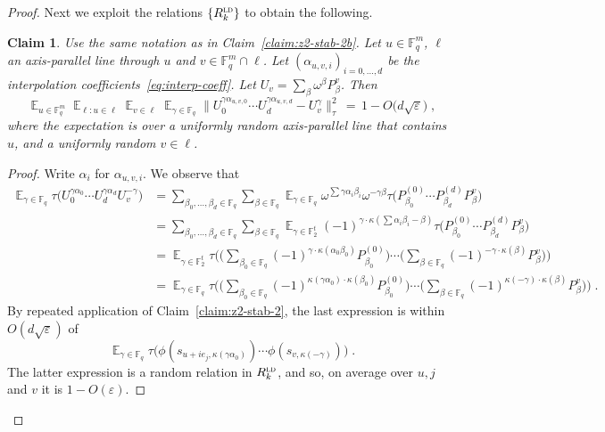 \documentclass[11pt]{article}
\newtheorem{claim}[theorem]{Claim}
\theoremstyle{definition}
\DeclareMathOperator*{\Expectation}{\mathbb{E}}
\newcommand{\Es}[1]{\Expectation_{#1}}
\newcommand{\F}{\ensuremath{\mathbb{F}}}
\newcommand{\ld}{\textsc{ld}}
\newcommand{\eps}{\varepsilon}
\begin{document}
\begin{proof}
Next we exploit the relations $\{R^\ld_k\}$ to obtain the following. 

\begin{claim}\label{claim:z2-stab-5}
Use the same notation as in Claim~\ref{claim:z2-stab-2b}. Let $u\in \F_q^m$, $\ell$ an axis-parallel line through $u$ and $v\in\F_q^m\cap \ell$. Let $(\alpha_{u,v,i})_{i=0,\ldots,d}$ be the interpolation coefficients~\eqref{eq:interp-coeff}. Let $U_v = \sum_\beta \omega^\beta P^v_\beta$. Then 
\begin{equation}\label{eq:z2-stab-5-0}
\Es{u\in\F_q^m} \Es{\ell: u\in \ell} \Es{v\in \ell} \Es{\gamma\in\F_q} \Big\| U_0^{\gamma \alpha_{u,v,0}}\cdots U_d^{\gamma  \alpha_{u,v,d}} - U_v^\gamma \big\|_\tau^2 \,=\, 1-O\big(d\sqrt{\eps}\big)\;,
\end{equation}
where the expectation is over a uniformly random axis-parallel line that contains $u$, and a uniformly random $v\in\ell$. 
\end{claim}

\begin{proof}
Write $\alpha_i$ for $\alpha_{u,v,i}$. 
We observe that 
\begin{align*}
\Es{\gamma\in\F_q} \tau\big( U_0^{\gamma\alpha_{0}}\cdots U_d^{\gamma\alpha_{d}} U_v^{-\gamma} \big)
&=  \sum_{\beta_0,\ldots,\beta_d\in\F_q}\sum_{\beta\in\F_q} \Es{\gamma\in\F_q} \omega^{\sum \gamma \alpha_i\beta_i} \omega^{-\gamma\beta} \tau\big( P^{(0)}_{\beta_0} \cdots P^{(d)}_{\beta_d} P^v_\beta \big)\\
&= \sum_{\beta_0,\ldots,\beta_d\in\F_q}\sum_{\beta\in\F_q}\Es{\gamma\in\F_2^t} (-1)^{\gamma\cdot \kappa(\sum \alpha_i\beta_i-\beta)} \tau\big( P^{(0)}_{\beta_0} \cdots P^{(d)}_{\beta_d} P^v_\beta \big)\\
&=\Es{\gamma\in\F_2^t}  \tau\Big( \Big(\sum_{\beta_0\in \F_q} (-1)^{\gamma\cdot \kappa(\alpha_0\beta_0)} P^{(0)}_{\beta_0} \Big)\cdots\Big(\sum_{\beta\in \F_q} (-1)^{-\gamma\cdot \kappa(\beta)} P^{v}_{\beta} \Big)\Big)\\
&=\Es{\gamma\in\F_q}  \tau\Big( \Big(\sum_{\beta_0\in \F_q} (-1)^{\kappa( \gamma \alpha_0)\cdot\kappa(\beta_0)} P^{(0)}_{\beta_0} \Big)\cdots\Big(\sum_{\beta\in \F_q} (-1)^{\kappa(-\gamma)\cdot \kappa(\beta)} P^{v}_{\beta} \Big)\Big)\;.
\end{align*}
By repeated application of Claim~\ref{claim:z2-stab-2}, the last expression is within $O(d\sqrt{\eps})$ of 
\[ \Es{\gamma\in\F_q}  \tau\big( \phi(s_{u+ie_j,\kappa(\gamma \alpha_0)})\cdots \phi(s_{v,\kappa(-\gamma)}) \big)\;.\]
The latter expression is a random relation in $R^\ld_k$, and so, on average over $u,j$ and $v$ it is $1-O(\eps)$.
\end{proof}



\end{proof}
\end{document}
